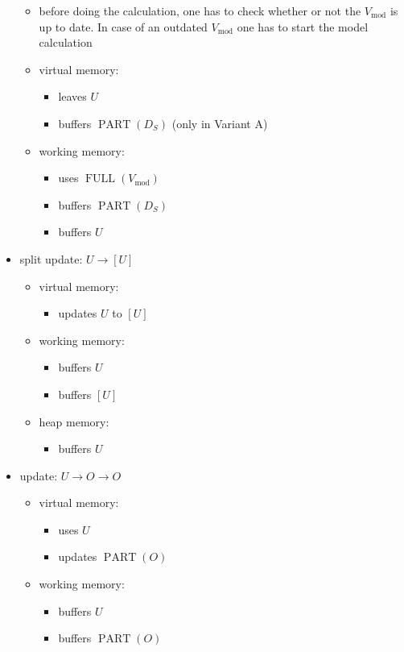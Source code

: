 \documentclass[12pt,a4paper]{article}
\DeclareMathOperator{\vmod}{mod}
\newcommand{\velmodel}{V_{\vmod}}
\newcommand{\slantstacks}{D_S}
\newcommand{\outp}{O}
\newcommand{\updatedescr}{U}
\DeclareMathOperator{\oppartof}{PART}
\DeclareMathOperator{\opfull}{FULL}
\newcommand{\parens}[3]{#1#3#2}
\newcommand{\K}[1]{\parens{(}{)}{#1}}
\newcommand{\lst}[1]{\parens{[}{]}{#1}}
\newcommand{\partof}[1]{\oppartof{}\K{#1}}
\newcommand{\full}[1]{\opfull{}\K{#1}}
\begin{document}
\begin{itemize}
\begin{description}
  \end{description}
  \begin{itemize}
  \item before doing the calculation, one has to check whether or not
    the $\velmodel$ is up to date. In case of an outdated $\velmodel$
    one has to start the model calculation
  \item virtual memory:
    \begin{itemize}
    \item leaves $\updatedescr$
    \item buffers $\partof{\slantstacks}$ (only in Variant A)
    \end{itemize}
  \item working memory:
    \begin{itemize}
    \item uses $\full{\velmodel}$
    \item buffers $\partof{\slantstacks}$
    \item buffers $\updatedescr$
    \end{itemize}
  \end{itemize}

\item split update: $\updatedescr \to \lst{\updatedescr}$
  \begin{itemize}
  \item virtual memory:
    \begin{itemize}
    \item updates $\updatedescr$ to $\lst{\updatedescr}$
    \end{itemize}
  \item working memory:
    \begin{itemize}
    \item buffers $\updatedescr$
    \item buffers $\lst{\updatedescr}$
    \end{itemize}
  \item heap memory:
    \begin{itemize}
    \item buffers $\updatedescr$
    \end{itemize}
  \end{itemize}

\item update: $\updatedescr \to \outp \to \outp$
  \begin{itemize}
  \item virtual memory:
    \begin{itemize}
    \item uses $\updatedescr$
    \item updates $\partof{\outp}$
    \end{itemize}
  \item working memory:
    \begin{itemize}
    \item buffers $\updatedescr$
    \item buffers $\partof{\outp}$
    \end{itemize}
  \end{itemize}

\end{itemize}
\end{document}
